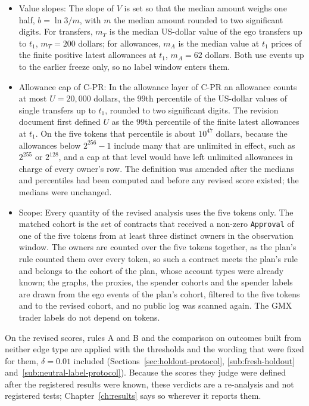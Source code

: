 \begin{itemize}
\item Value slopes: The slope of $V$ is set so that the median amount weighs one half, $b=\ln 3/m$, with $m$ the median amount rounded to two significant digits. For transfers, $m_T$ is the median US-dollar value of the ego transfers up to $t_1$, $m_T=200$ dollars; for allowances, $m_A$ is the median value at $t_1$ prices of the finite positive latest allowances at $t_1$, $m_A=62$ dollars. Both use events up to the earlier freeze only, so no label window enters them.
\item Allowance cap of C-PR: In the allowance layer of C-PR an allowance counts at most $U=20{,}000$ dollars, the 99th percentile of the US-dollar values of single transfers up to $t_1$, rounded to two significant digits. The revision document first defined $U$ as the 99th percentile of the finite latest allowances at $t_1$. On the five tokens that percentile is about $10^{47}$ dollars, because the allowances below $2^{256}-1$ include many that are unlimited in effect, such as $2^{255}$ or $2^{128}$, and a cap at that level would have left unlimited allowances in charge of every owner's row. The definition was amended after the medians and percentiles had been computed and before any revised score existed; the medians were unchanged.
\item Scope: Every quantity of the revised analysis uses the five tokens only. The matched cohort is the set of contracts that received a non-zero \texttt{Approval} of one of the five tokens from at least three distinct owners in the observation window. The owners are counted over the five tokens together, as the plan's rule counted them over every token, so such a contract meets the plan's rule and belongs to the cohort of the plan, whose account types were already known; the graphs, the proxies, the spender cohorts and the spender labels are drawn from the ego events of the plan's cohort, filtered to the five tokens and to the revised cohort, and no public log was scanned again. The GMX trader labels do not depend on tokens.
\end{itemize}

On the revised scores, rules A and B and the comparison on outcomes built from neither edge type are applied with the thresholds and the wording that were fixed for them, $\delta=0.01$ included (Sections~\ref{sec:holdout-protocol}, \ref{sub:fresh-holdout} and~\ref{sub:neutral-label-protocol}). Because the scores they judge were defined after the registered results were known, these verdicts are a re-analysis and not registered tests; Chapter~\ref{ch:results} says so wherever it reports them.


